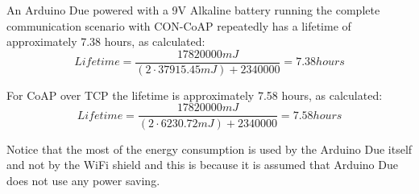 An Arduino Due powered with a 9V Alkaline battery running the complete communication scenario with CON-CoAP repeatedly has a lifetime of approximately 7.38 hours, as calculated: 
\begin{equation}\label{eq:concoaphours}
Lifetime = \frac{17820000 mJ }{(2 \cdot 37915.45 mJ)+2340000} =7.38 hours %
\end{equation}

For CoAP over TCP the lifetime is approximately 7.58 hours, as calculated:
\begin{equation}\label{eq:years}
Lifetime = \frac{17820000 mJ }{(2 \cdot 6230.72 mJ)+2340000 } = 7.58 hours %
\end{equation}

Notice that the most of the energy consumption is used by the Arduino Due itself and not by the WiFi shield and this is because it is assumed that Arduino Due does not use any power saving.


